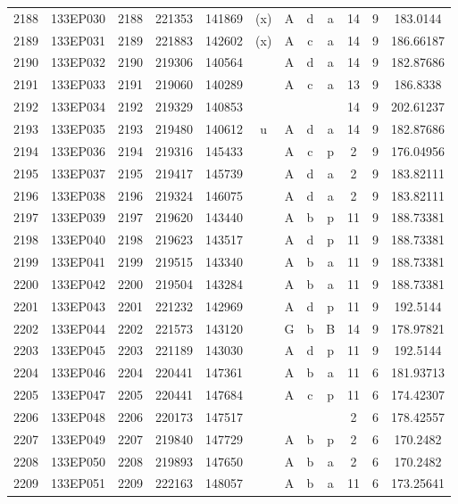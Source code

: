 \begin{tabular}{|*{12}{c|}}
2188 & 133EP030 & 2188 & 221353 & 141869 & (x) & A & d & a & 14 & 9 & 183.0144 \\ 
2189 & 133EP031 & 2189 & 221883 & 142602 & (x) & A & c & a & 14 & 9 & 186.66187 \\ 
2190 & 133EP032 & 2190 & 219306 & 140564 &  & A & d & a & 14 & 9 & 182.87686 \\ 
2191 & 133EP033 & 2191 & 219060 & 140289 &  & A & c & a & 13 & 9 & 186.8338 \\ 
2192 & 133EP034 & 2192 & 219329 & 140853 &  &  &  &  & 14 & 9 & 202.61237 \\ 
2193 & 133EP035 & 2193 & 219480 & 140612 & u & A & d & a & 14 & 9 & 182.87686 \\ 
2194 & 133EP036 & 2194 & 219316 & 145433 &  & A & c & p & 2 & 9 & 176.04956 \\ 
2195 & 133EP037 & 2195 & 219417 & 145739 &  & A & d & a & 2 & 9 & 183.82111 \\ 
2196 & 133EP038 & 2196 & 219324 & 146075 &  & A & d & a & 2 & 9 & 183.82111 \\ 
2197 & 133EP039 & 2197 & 219620 & 143440 &  & A & b & p & 11 & 9 & 188.73381 \\ 
2198 & 133EP040 & 2198 & 219623 & 143517 &  & A & d & p & 11 & 9 & 188.73381 \\ 
2199 & 133EP041 & 2199 & 219515 & 143340 &  & A & b & a & 11 & 9 & 188.73381 \\ 
2200 & 133EP042 & 2200 & 219504 & 143284 &  & A & b & a & 11 & 9 & 188.73381 \\ 
2201 & 133EP043 & 2201 & 221232 & 142969 &  & A & d & p & 11 & 9 & 192.5144 \\ 
2202 & 133EP044 & 2202 & 221573 & 143120 &  & G & b & B & 14 & 9 & 178.97821 \\ 
2203 & 133EP045 & 2203 & 221189 & 143030 &  & A & d & p & 11 & 9 & 192.5144 \\ 
2204 & 133EP046 & 2204 & 220441 & 147361 &  & A & b & a & 11 & 6 & 181.93713 \\ 
2205 & 133EP047 & 2205 & 220441 & 147684 &  & A & c & p & 11 & 6 & 174.42307 \\ 
2206 & 133EP048 & 2206 & 220173 & 147517 &  &  &  &  & 2 & 6 & 178.42557 \\ 
2207 & 133EP049 & 2207 & 219840 & 147729 &  & A & b & p & 2 & 6 & 170.2482 \\ 
2208 & 133EP050 & 2208 & 219893 & 147650 &  & A & b & a & 2 & 6 & 170.2482 \\ 
2209 & 133EP051 & 2209 & 222163 & 148057 &  & A & b & a & 11 & 6 & 173.25641 \\ 

\end{tabular}
